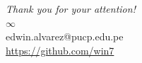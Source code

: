 \documentclass{beamer}
\begin{document}
\begin{frame}[allowframebreaks]
\end{frame}

\begin{frame}
    \begin{center}
        {\Huge\textit{Thank you for your attention!}}\\
        $\infty$ \\
        edwin.alvarez@pucp.edu.pe\\
        \url{https://github.com/win7}
    \end{center}
\end{frame}

% 
\end{document}
